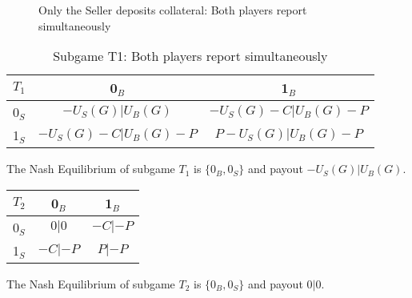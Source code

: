 \documentclass{cacthesis}
\begin{document}
\begin{figure}[htb!]
    \centering
    \caption{Only the Seller deposits collateral: Both players report simultaneously}
\end{figure}

\begin{table}[htb!]
    \centering
    \begin{tabular}{ c||c|c| }
    $T_1$& 0$_B$ & 1$_B$   \\
    \hline
    \hline
    0$_S$ & $-U_S(G) | U_B(G)$ & $-U_S(G) - C | U_B(G) - P$ \\
    \hline
    1$_S$ & $-U_S(G) - C | U_B(G) - P$ & $P - U_S(G) | U_B(G) - P$\\ 
    \hline
    \end{tabular}
    \caption{Subgame T1: Both players report simultaneously}
\end{table}

The Nash Equilibrium of subgame $T_1$ is $\{0_B, 0_S\}$ and payout $-U_S(G) | U_B(G)$.
\begin{center}
    \begin{tabular}{ c||c|c| }
    $T_2$& 0$_B$ & 1$_B$   \\
    \hline
    \hline
    0$_S$ & $0 | 0$ & $-C|-P$ \\
    \hline
    1$_S$ & $-C|-P$ & $P | -P$\\ 
    \hline
    \end{tabular}
\end{center}

The Nash Equilibrium of subgame $T_2$ is $\{0_B, 0_S\}$ and payout $0 | 0$. \newline
\end{document}
